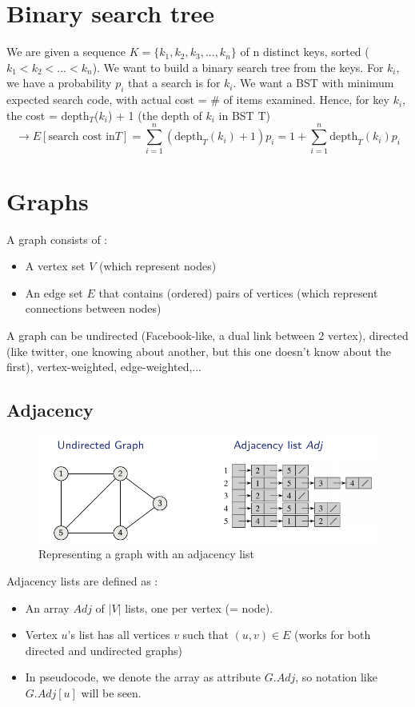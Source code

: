 \documentclass[12pt,twoside,a4paper]{article}
\begin{document}
\section{Binary search tree}
We are given a sequence $K = \{k_1,k_2,k_3,...,k_n\}$ of n distinct keys, sorted ($k_1 < k_2 < ... < k_n$). We want to build a binary search tree from the keys. For $k_i$, we have a probability $p_i$ that a search is for $k_i$. We want a BST with minimum expected search code, with actual cost = \# of items examined. Hence, for key $k_i$, the cost = depth$_T$($k_i$) + 1 (the depth of $k_i$ in BST T)
\[\to E[\text{search cost in} T] =  \sum_{i=1}^n (\text{depth}_T(k_i) + 1) p_i = 1+\sum_{i=1}^n \text{depth}_T(k_i) p_i\]

\section{Graphs}
A graph consists of :
\begin{itemize}
	\item 	A vertex set $V$ (which represent nodes)
	\item 	An edge set $E$ that contains (ordered) pairs of vertices (which represent connections between nodes)
\end{itemize}
A graph can be undirected (Facebook-like, a dual link between 2 vertex), directed (like twitter, one knowing about another, but this one doesn't know about the first), vertex-weighted, edge-weighted,...

\subsection{Adjacency}
\begin{figure}[h]
	\centering
	\includegraphics[scale=0.5]{images/adjacency_List}
	\caption{Representing a graph with an adjacency list}
\end{figure}
Adjacency lists are defined as :
\begin{itemize}
	\item 	An array  $Adj$ of $|V|$ lists, one per vertex (= node).
	\item 	Vertex $u$'s list has all vertices $v$ such that $(u,v) \in E$ (works for both directed and undirected graphs)
	\item 	In pseudocode, we denote the array as attribute $G.Adj$, so notation like $G.Adj[u]$ will be seen.
\end{itemize}
\end{document}
